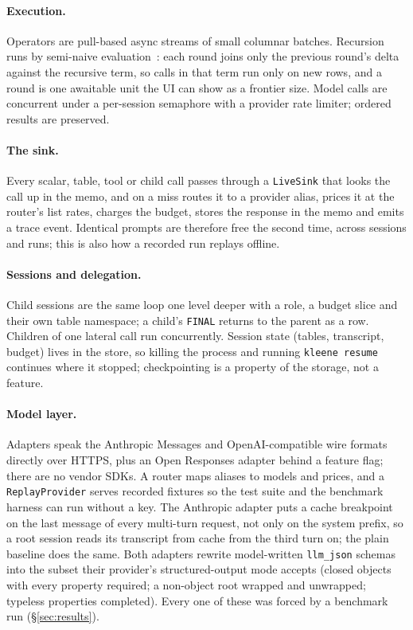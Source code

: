 \documentclass[11pt,a4paper]{article}
\newcommand{\code}[1]{\texttt{#1}}
\begin{document}
\paragraph{Execution.} Operators are pull-based async streams of small columnar
batches. Recursion runs by semi-naive evaluation~\citep{bancilhon1986amateur}:
each round joins only the previous round's delta against the recursive term, so
calls in that term run only on new rows, and a round is one awaitable unit the
UI can show as a frontier size. Model calls are concurrent under a per-session
semaphore with a provider rate limiter; ordered results are preserved.

\paragraph{The sink.} Every scalar, table, tool or child call passes through a
\code{LiveSink} that looks the call up in the memo, and on a miss routes it to a
provider alias, prices it at the router's list rates, charges the budget, stores
the response in the memo and emits a trace event. Identical prompts are
therefore free the second time, across sessions and runs; this is also how a
recorded run replays offline.

\paragraph{Sessions and delegation.} Child sessions are the same loop one level
deeper with a role, a budget slice and their own table namespace; a child's
\code{FINAL} returns to the parent as a row. Children of one lateral call run
concurrently. Session state (tables, transcript, budget) lives in the store, so
killing the process and running \code{kleene resume} continues where it stopped;
checkpointing is a property of the storage, not a feature.

\paragraph{Model layer.} Adapters speak the Anthropic Messages and
OpenAI-compatible wire formats directly over HTTPS, plus an Open Responses
adapter behind a feature flag; there are no vendor SDKs. A router maps aliases
to models and prices, and a \code{ReplayProvider} serves recorded fixtures so
the test suite and the benchmark harness can run without a key. The
Anthropic adapter puts a cache breakpoint on the last message of every
multi-turn request, not only on the system prefix, so a root session reads
its transcript from cache from the third turn on; the plain baseline does the
same. Both adapters rewrite model-written \code{llm\_json} schemas into the
subset their provider's structured-output mode accepts (closed objects with
every property required; a non-object root wrapped and unwrapped; typeless
properties completed). Every one of these was forced by a benchmark run
(\S\ref{sec:results}).
\end{document}
